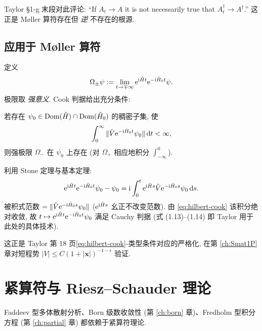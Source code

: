 Taylor \S 1-g 末段对此评论: ``If $A_t\to A$ it is not necessarily true that $A_t^\dagger\to A^\dagger$.'' 这正是 Møller 算符存在但 \emph{逆} 不存在的根源.

\subsection{应用于 Møller 算符}

定义
\begin{equation}\label{eq:hilbert-moller-strong}
\Omega_\pm\psi:=\lim_{t\to\mp\infty}\mathrm{e}^{\mathrm{i}\hat{H}t}\mathrm{e}^{-\mathrm{i}\hat{H}_0 t}\psi.
\end{equation}
极限取 \emph{强意义}. Cook 判据给出充分条件:

\begin{theorem}[Cook 判据]\label{thm:hilbert-cook}
若存在 $\psi_0\in\operatorname{Dom}(\hat{H})\cap\operatorname{Dom}(\hat{H}_0)$ 的稠密子集, 使
\begin{equation}\label{eq:hilbert-cook}
\int_{0}^{\infty}\|\hat{V}\mathrm{e}^{-\mathrm{i}\hat{H}_0 t}\psi_0\|\,\mathrm{d} t<\infty,
\end{equation}
则强极限 $\Omega_-$ 在 $\psi_0$ 上存在 (对 $\Omega_+$ 相应地积分 $\int_{-\infty}^0$).
\end{theorem}

\begin{proof*}[思路]
利用 Stone 定理与基本定理:
\begin{equation*}
\mathrm{e}^{\mathrm{i}\hat{H}t}\mathrm{e}^{-\mathrm{i}\hat{H}_0 t}\psi_0-\psi_0
=\mathrm{i}\int_0^t\mathrm{e}^{\mathrm{i}\hat{H}s}\hat{V}\mathrm{e}^{-\mathrm{i}\hat{H}_0 s}\psi_0\,\mathrm{d} s.
\end{equation*}
被积式范数 $=\|\hat{V}\mathrm{e}^{-\mathrm{i}\hat{H}_0 s}\psi_0\|$ ($\mathrm{e}^{\mathrm{i}\hat{H}s}$ 幺正不改变范数). 由 \eqref{eq:hilbert-cook} 该积分绝对收敛, 故 $t\mapsto \mathrm{e}^{\mathrm{i}\hat{H}t}\mathrm{e}^{-\mathrm{i}\hat{H}_0 t}\psi_0$ 满足 Cauchy 判据 (式 (1.13)--(1.14) 即 Taylor 用于此处的具体技术).
\end{proof*}

这正是 Taylor 第 18 页\eqref{eq:hilbert-cook}-类型条件对应的严格化, 在第 \ref{ch:Smat1P} 章对短程势 $|V|\leq C(1+|\mathbf{x}|)^{-1-\epsilon}$ 验证.

\section{紧算符与 Riesz--Schauder 理论}\label{sec:hilbert-compact}

Faddeev 型多体散射分析、Born 级数收敛性 (第 \ref{ch:born} 章)、Fredholm 型积分方程 (第 \ref{ch:partial} 章) 都依赖于紧算符理论.

